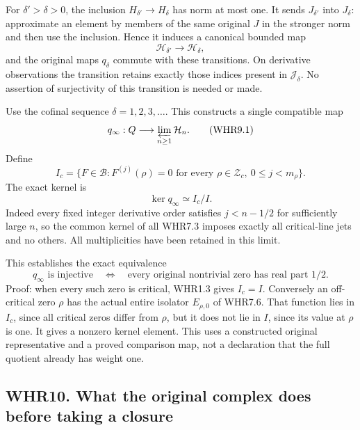 For \(\delta'>\delta>0\), the inclusion \(H_{\delta'}\to H_\delta\) has
norm at most one. It sends \(J_{\delta'}\) into \(J_\delta\):
approximate an element by members of the same original \(J\) in the
stronger norm and then use the inclusion. Hence it induces a canonical
bounded map \[
 \mathcal H_{\delta'}\longrightarrow\mathcal H_\delta,
\] and the original maps \(q_\delta\) commute with these transitions. On
derivative observations the transition retains exactly those indices
present in \(\mathscr J_\delta\). No assertion of surjectivity of this
transition is needed or made.

Use the cofinal sequence \(\delta=1,2,3,\ldots\). This constructs a
single compatible map \[
 q_\infty:Q\longrightarrow\varprojlim_{n\geq1}\mathcal H_n.
 \tag{WHR9.1}
\] Define \[
 I_c=\{F\in\mathcal B:F^{(j)}(\rho)=0
        \text{ for every }\rho\in\mathscr Z_c,
                   \ 0\leq j<m_\rho\}.
\] The exact kernel is \[
 \boxed{\ker q_\infty\simeq I_c/I.}
 \tag{WHR9.2}
\] Indeed every fixed integer derivative order satisfies \(j<n-1/2\) for
sufficiently large \(n\), so the common kernel of all WHR7.3 imposes
exactly all critical-line jets and no others. All multiplicities have
been retained in this limit.

This establishes the exact equivalence \[
 \boxed{q_\infty\text{ is injective}\quad\Longleftrightarrow\quad
    \text{every original nontrivial zero has real part }1/2.}
 \tag{WHR9.3}
\] Proof: when every such zero is critical, WHR1.3 gives \(I_c=I\).
Conversely an off-critical zero \(\rho\) has the actual entire isolator
\(E_{\rho,0}\) of WHR7.6. That function lies in \(I_c\), since all
critical zeros differ from \(\rho\), but it does not lie in \(I\), since
its value at \(\rho\) is one. It gives a nonzero kernel element. This
uses a constructed original representative and a proved comparison map,
not a declaration that the full quotient already has weight one.

\subsection{WHR10. What the original complex does before taking a
closure}\label{whr10.-what-the-original-complex-does-before-taking-a-closure}

